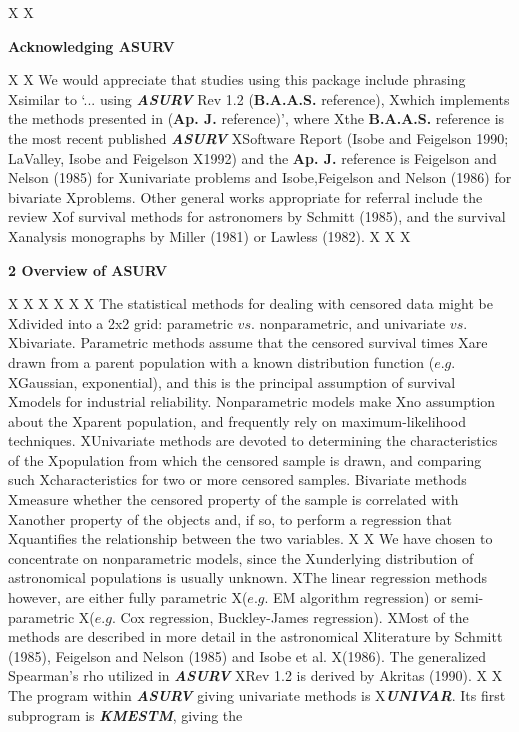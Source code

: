 X\bigskip
X\centerline{\Large\bf Acknowledging ASURV}
X
X     We would appreciate that studies using this package include phrasing
Xsimilar to `... using {\sl\bf ASURV} Rev 1.2 ({\bf B.A.A.S.} reference),
Xwhich implements the methods presented in ({\bf Ap. J.} reference)', where
Xthe {\bf B.A.A.S.} reference is the most recent published {\sl\bf ASURV}
XSoftware Report (Isobe and Feigelson 1990; LaValley, Isobe and Feigelson 
X1992) and the {\bf Ap. J.} reference is Feigelson and Nelson (1985) for
Xunivariate problems and Isobe,Feigelson and Nelson (1986) for bivariate
Xproblems.  Other general works appropriate for referral include the review
Xof survival methods for astronomers by Schmitt (1985), and the survival 
Xanalysis monographs by Miller (1981) or Lawless (1982).
X
X\newpage
X\centerline{\Large\bf 2 Overview of ASURV}
X    
X       
X\medskip
X
X
X     The statistical methods for dealing with censored data might be
Xdivided into a 2x2 grid: parametric $vs.$ nonparametric, and univariate $vs.$
Xbivariate.  Parametric methods assume that the censored survival times
Xare drawn from a parent population with a known distribution function ($e.g.$
XGaussian, exponential), and this is the principal assumption of survival
Xmodels for industrial reliability.  Nonparametric models make 
Xno assumption about the 
Xparent population, and frequently rely on maximum-likelihood techniques. 
XUnivariate methods are devoted to determining the characteristics of the
Xpopulation from which the censored sample is drawn, and comparing such 
Xcharacteristics for two or more censored samples.  Bivariate methods
Xmeasure whether the censored property of the sample is correlated with 
Xanother property of the objects and, if so, to perform a regression  that 
Xquantifies the relationship between the two variables.
X 
X     We have chosen to concentrate on nonparametric models, since  the 
Xunderlying distribution of astronomical populations is usually unknown. 
XThe linear regression methods however, are either fully parametric 
X($e.g.$ EM algorithm regression) or semi-parametric
X($e.g.$ Cox regression, Buckley-James regression). 
XMost of the methods are described in more detail in the astronomical 
Xliterature by Schmitt (1985), Feigelson and Nelson (1985) and Isobe et al. 
X(1986).  The generalized Spearman's rho utilized in {\sl\bf ASURV} 
XRev 1.2 is derived by Akritas (1990).
X
X     The program within {\sl\bf ASURV} giving univariate methods is 
X{\sl\bf UNIVAR}.  Its first subprogram is {\sl\bf KMESTM}, giving the 
